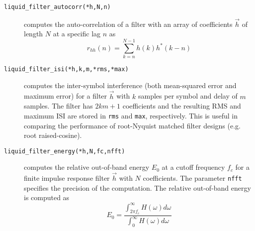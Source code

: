 \begin{description}
\item[{\tt liquid\_filter\_autocorr(*h,N,n)}]
    computes the auto-correlation of a filter with an array of
    coefficients $\vec{h}$ of length $N$ at a specific lag $n$ as
    \[
        r_{hh}(n) = \sum_{k=n}^{N-1} {h(k)h^*(k-n)}
    \]

\item[{\tt liquid\_filter\_isi(*h,k,m,*rms,*max)}]
    computes the inter-symbol interference 
    (both mean-squared error and maximum error)
    for a filter $\vec{h}$ with $k$ samples per symbol and delay of $m$
    samples.
    The filter has $2km+1$ coefficients and the resulting
    RMS and maximum ISI are stored in {\tt rms} and {\tt max},
    respectively.
    This is useful in comparing the performance of root-Nyquist matched
    filter designs (e.g. root raised-cosine).

\item[{\tt liquid\_filter\_energy(*h,N,fc,nfft)}]
    computes the relative out-of-band energy $E_0$ at a cutoff frequency
    $f_c$ for a finite impulse response filter $\vec{h}$ with $N$
    coefficients.
    The parameter {\tt nfft} specifies the precision of the computation.
    The relative out-of-band energy is computed as
    \begin{equation}
    \label{eqn:filter:firdes:misc:filter_energy}
        E_0 =
            \frac{
                \int_{2 \pi f_c}^{\infty}{H(\omega)d\omega}
            } {
                \int_{0}^{\infty}{H(\omega)d\omega}
            }
    \end{equation}

\end{description}

